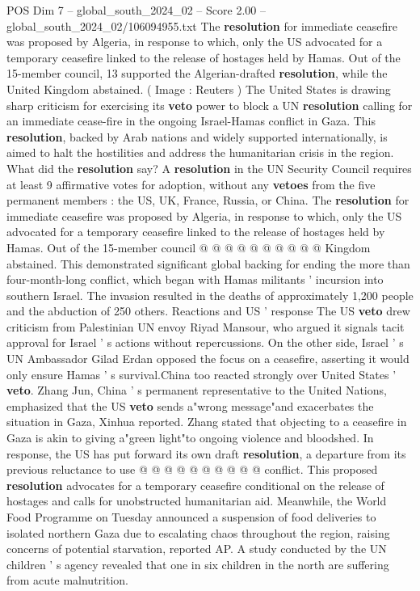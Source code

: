 \begin{textsample}{POS Dim 7 – global\_south\_2024\_02 – Score 2.00 – global\_south\_2024\_02/106094955.txt}  \label{ex:f7_pos_054}
The \textbf{resolution} for immediate ceasefire was proposed by Algeria, in response to which, only the US advocated for a temporary ceasefire linked to the release of hostages held by Hamas.
Out of the 15-member council, 13 supported the Algerian-drafted \textbf{resolution}, while the United Kingdom abstained. ( Image : Reuters ) The United States is drawing sharp criticism for exercising its \textbf{veto} power to block a UN \textbf{resolution} calling for an immediate cease-fire in the ongoing Israel-Hamas conflict in Gaza.
This \textbf{resolution}, backed by Arab nations and widely supported internationally, is aimed to halt the hostilities and address the humanitarian crisis in the region.
What did the \textbf{resolution} say?
A \textbf{resolution} in the UN Security Council requires at least 9 affirmative votes for adoption, without any \textbf{vetoes} from the five permanent members : the US, UK, France, Russia, or China.
The \textbf{resolution} for immediate ceasefire was proposed by Algeria, in response to which, only the US advocated for a temporary ceasefire linked to the release of hostages held by Hamas.
Out of the 15-member council @ @ @ @ @ @ @ @ @ @ Kingdom abstained.
This demonstrated significant global backing for ending the more than four-month-long conflict, which began with Hamas militants ' incursion into southern Israel.
The invasion resulted in the deaths of approximately 1,200 people and the abduction of 250 others.
Reactions and US ' response The US \textbf{veto} drew criticism from Palestinian UN envoy Riyad Mansour, who argued it signals tacit approval for Israel ' s actions without repercussions.
On the other side, Israel ' s UN Ambassador Gilad Erdan opposed the focus on a ceasefire, asserting it would only ensure Hamas ' s survival.China too reacted strongly over United States ' \textbf{veto}.
Zhang Jun, China ' s permanent representative to the United Nations, emphasized that the US \textbf{veto} sends a"wrong message"and exacerbates the situation in Gaza, Xinhua reported.
Zhang stated that objecting to a ceasefire in Gaza is akin to giving a"green light"to ongoing violence and bloodshed.
In response, the US has put forward its own draft \textbf{resolution}, a departure from its previous reluctance to use @ @ @ @ @ @ @ @ @ @ conflict.
This proposed \textbf{resolution} advocates for a temporary ceasefire conditional on the release of hostages and calls for unobstructed humanitarian aid.
Meanwhile, the World Food Programme on Tuesday announced a suspension of food deliveries to isolated northern Gaza due to escalating chaos throughout the region, raising concerns of potential starvation, reported AP.
A study conducted by the UN children ' s agency revealed that one in six children in the north are suffering from acute malnutrition.

\end{textsample}
